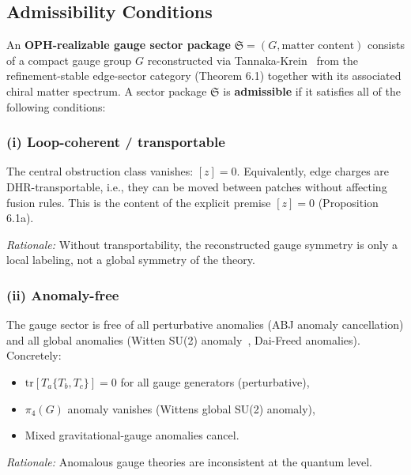 \subsection{Admissibility Conditions}\label{2-admissibility-conditions}

An \textbf{OPH-realizable gauge sector package} \(\mathfrak S = (G, \text{matter content})\) consists of a compact gauge group \(G\) reconstructed via Tannaka-Krein~\cite{tannaka38,krein49,dr89,dr90} from the refinement-stable edge-sector category (Theorem 6.1) together with its associated chiral matter spectrum. A sector package \(\mathfrak S\) is \textbf{admissible} if it satisfies all of the following conditions:

\subsubsection{(i) Loop-coherent / transportable}\label{i-loop-coherent--transportable}

The central obstruction class vanishes: \([z] = 0\). Equivalently, edge charges are DHR-transportable, i.e., they can be moved between patches without affecting fusion rules. This is the content of the explicit premise \([z] = 0\) (Proposition 6.1a).

\emph{Rationale:} Without transportability, the reconstructed gauge symmetry is only a local labeling, not a global symmetry of the theory.

\subsubsection{(ii) Anomaly-free}\label{ii-anomaly-free}

The gauge sector is free of all perturbative anomalies (ABJ anomaly cancellation) and all global anomalies (Witten SU(2) anomaly~\cite{witten82}, Dai-Freed anomalies). Concretely:

\begin{itemize}
\tightlist
\item
  \(\mathrm{tr}[T_a \{T_b, T_c\}] = 0\) for all gauge generators (perturbative),
\item
  \(\pi_4(G)\) anomaly vanishes (Witten\textquotesingle s global SU(2) anomaly),
\item
  Mixed gravitational-gauge anomalies cancel.
\end{itemize}

\emph{Rationale:} Anomalous gauge theories are inconsistent at the quantum level.

